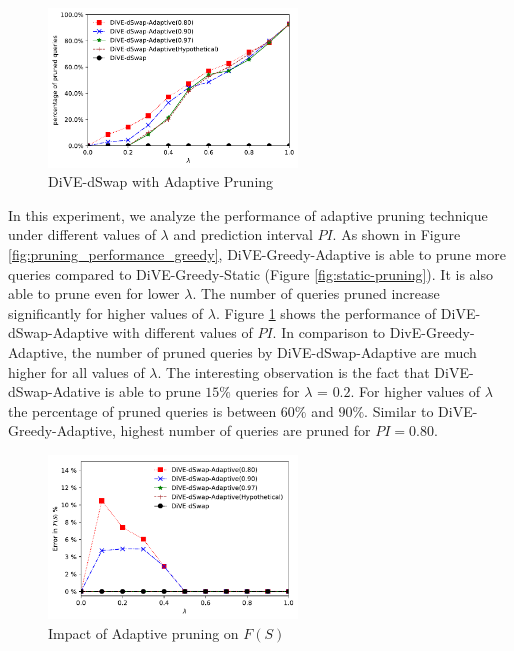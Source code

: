 \begin{figure}[t]
	\includegraphics[width=2.6in]{figures/results/pruning_performance_dswap_adaptive_color}
				\vspace{-15pt}
	\caption{DiVE-dSwap with Adaptive Pruning}%
	\label{fig:impact_lambda_to_PI_sampling_swapd_pruning}
\end{figure}


{}
In this experiment, we analyze the performance of adaptive pruning technique under different values of $\lambda$ and prediction interval $PI$. As shown in Figure \ref{fig:pruning_performance_greedy}, DiVE-Greedy-Adaptive is able to prune more queries compared to DiVE-Greedy-Static (Figure \ref{fig:static-pruning}). It is also able to prune even for lower $\lambda$. The number of queries pruned increase significantly for higher values of $\lambda$. Figure \ref{fig:impact_lambda_to_PI_sampling_swapd_pruning} shows the performance of DiVE-dSwap-Adaptive with different values of $ PI $. In comparison to DivE-Greedy-Adaptive, the number of pruned queries by DiVE-dSwap-Adaptive are much higher for all values of $\lambda$. The interesting observation is the fact that DiVE-dSwap-Adative is able to prune $15\%$ queries for $\lambda$ = $0.2$. For higher values of $\lambda$ the percentage of pruned queries is between $60\%$ and $90\%$. Similar to DiVE-Greedy-Adaptive, highest number of queries are pruned for $PI=0.80$. 
	

\begin{figure}[t]
	\includegraphics[width=2.6in]{figures/results/error_f_s_color}
				\vspace{-15pt}
	\caption{Impact of Adaptive pruning on $F(S)$}
	\label{fig:pruning_performance_swapd}
\end{figure}

